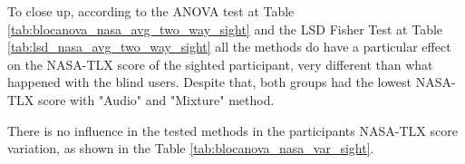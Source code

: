 
%

To close up, according to the ANOVA test at Table \ref{tab:blocanova_nasa_avg_two_way_sight} and the LSD Fisher Test at Table \ref{tab:lsd_nasa_avg_two_way_sight} all the methods do have a particular effect on the NASA-TLX score of the sighted participant, very different than what happened with the blind users. Despite that, both groups had the lowest NASA-TLX score with "Audio" and "Mixture" method.

There is no influence in the tested methods in the participants NASA-TLX score variation, as shown in the Table \ref{tab:blocanova_nasa_var_sight}.

\FloatBarrier